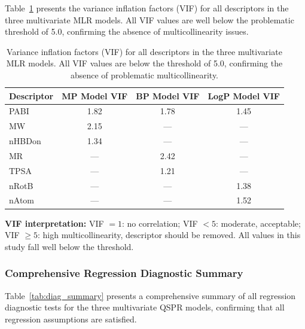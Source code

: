 \documentclass[12pt,a4paper]{article}
\begin{document}
Table~\ref{tab:vif_summary} presents the variance inflation factors (VIF) for all descriptors in the three multivariate MLR models. All VIF values are well below the problematic threshold of 5.0, confirming the absence of multicollinearity issues.

\begin{table}[H]
\centering
\caption{Variance inflation factors (VIF) for all descriptors in the three multivariate MLR models. All VIF values are below the threshold of 5.0, confirming the absence of problematic multicollinearity.}
\label{tab:vif_summary}
\begin{tabular}{@{}lccc@{}}
\toprule
\textbf{Descriptor} & \textbf{MP Model VIF} & \textbf{BP Model VIF} & \textbf{LogP Model VIF} \\
\midrule
PABI & 1.82 & 1.78 & 1.45 \\
MW & 2.15 & --- & --- \\
nHBDon & 1.34 & --- & --- \\
MR & --- & 2.42 & --- \\
TPSA & --- & 1.21 & --- \\
nRotB & --- & --- & 1.38 \\
nAtom & --- & --- & 1.52 \\
\bottomrule
\end{tabular}
\end{table}

\noindent\textbf{VIF interpretation:} VIF $= 1$: no correlation; VIF $< 5$: moderate, acceptable; VIF $\geq 5$: high multicollinearity, descriptor should be removed. All values in this study fall well below the threshold.

\subsubsection{Comprehensive Regression Diagnostic Summary}

Table~\ref{tab:diag_summary} presents a comprehensive summary of all regression diagnostic tests for the three multivariate QSPR models, confirming that all regression assumptions are satisfied.
\end{document}
